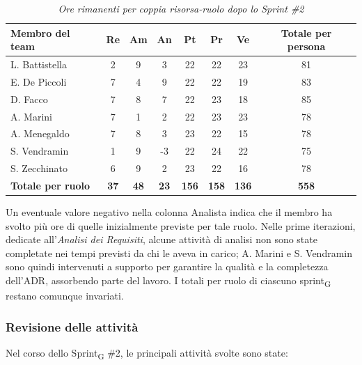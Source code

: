 ﻿\documentclass[a4paper, 10pt, colorlinks=true, linkcolor=black, urlcolor=blue, citecolor=blue, hidelinks]{article}
\renewcommand{\arraystretch}{1.2}
\begin{document}
\begin{table}[H]
    \centering
    \renewcommand{\arraystretch}{1.4}
    \begin{tabular}{|l|c|c|c|c|c|c|c|}
        \hline
        \rowcolor{bluBitless!15}
        \textbf{Membro del team} & \textbf{Re} & \textbf{Am} & \textbf{An} & \textbf{Pt} & \textbf{Pr} & \textbf{Ve} & \textbf{Totale per persona} \\
        \hline
        L. Battistella & 2 & 9 & 3 & 22 & 22 & 23 & 81 \\ \hline
        E. De Piccoli & 7 & 4 & 9 & 22 & 22 & 19 & 83 \\ \hline
        D. Facco & 7 & 8 & 7 & 22 & 23 & 18 & 85 \\ \hline
        A. Marini & 7 & 1 & 2 & 22 & 23 & 23 & 78 \\ \hline
        A. Menegaldo & 7 & 8 & 3 & 23 & 22 & 15 & 78 \\ \hline
        S. Vendramin & 1 & 9 & -3 & 22 & 24 & 22 & 75 \\ \hline
        S. Zecchinato & 6 & 9 & 2 & 23 & 22 & 16 & 78 \\ \hline
        \rowcolor{bluBitless!8}
        \textbf{Totale per ruolo} & \textbf{37} & \textbf{48} & \textbf{23} & \textbf{156} & \textbf{158} & \textbf{136} & \textbf{558} \\
        \hline
    \end{tabular}
    \caption{\textit{Ore rimanenti per coppia risorsa-ruolo dopo lo Sprint \#2}}
\end{table}

Un eventuale valore negativo nella colonna Analista indica che il membro ha svolto più ore di quelle inizialmente previste per tale ruolo. Nelle prime iterazioni, dedicate all'\textit{Analisi dei Requisiti}, alcune attività di analisi non sono state completate nei tempi previsti da chi le aveva in carico; A. Marini e S. Vendramin sono quindi intervenuti a supporto per garantire la qualità e la completezza dell'ADR, assorbendo parte del lavoro. I totali per ruolo di ciascuno sprint\textsubscript{G} restano comunque invariati.

\subsubsection{Revisione delle attività}
Nel corso dello Sprint\textsubscript{G} \#2, le principali attività svolte sono state:
\end{document}
